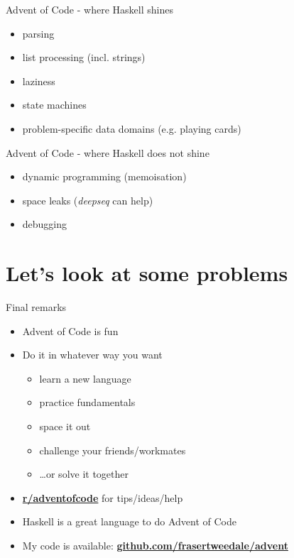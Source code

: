 \documentclass[ignorenonframetext,aspectratio=169,12pt]{beamer}
\begin{document}
\begin{frame}{Advent of Code - where Haskell shines}

    \begin{itemize}
        \item parsing
        \item list processing (incl. strings)
        \item laziness
        \item state machines
        \item problem-specific data domains (e.g. playing cards)
    \end{itemize}

\end{frame}


\begin{frame}{Advent of Code - where Haskell does not shine}

    \begin{itemize}
        \item dynamic programming (memoisation)
        \item space leaks ({\em deepseq} can help)
        \item debugging
    \end{itemize}

\end{frame}

\section{Let's look at some problems}

\begin{frame}{Final remarks}

    \begin{itemize}
        \item Advent of Code is fun
        \item Do it in whatever way you want
            \begin{itemize}
                \item learn a new language
                \item practice fundamentals
                \item space it out
                \item challenge your friends/workmates
                \item \ldots{}or solve it together
            \end{itemize}
        \item \href{https://www.reddit.com/r/adventofcode/}{\bf r/adventofcode} for tips/ideas/help
        \item Haskell is a great language to do Advent of Code
        \item My code is available:
            \href{https://github.com/frasertweedale/advent}{\bf github.com/frasertweedale/advent}
    \end{itemize}

\end{frame}
\end{document}
